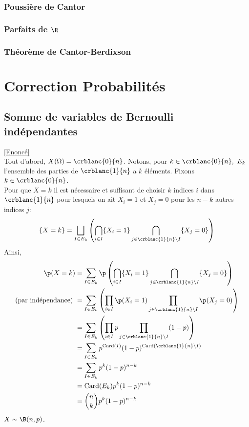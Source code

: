 \documentclass[8pt]{book}
\begin{document}
	\subsubsection{Poussière de Cantor}
	\subsubsection{Parfaits de $\R$}
	\subsubsection{Théorème de Cantor-Berdixson}
	
	\newpage
\section{Correction Probabilités}
	\subsection{Somme de variables de Bernoulli indépendantes }
	\label{Somme de variables de Bernoulli indépendantes corrigé}
		\textcolor{blue}{\hyperref[Somme de variables de Bernoulli indépedantes]{[Enoncé]}}\\
	Tout d'abord, $X(\Omega)=\crblanc{0}{n}$. Notons, pour $k\in \crblanc{0}{n},\ E_k$ l'ensemble des parties de $\crblanc{1}{n}$ a $k$ éléments. Fixons $k\in \crblanc{0}{n}$.\\
	Pour que $X=k$ il est nécessaire et suffisant de choisir $k$ indices $i$ dans $\crblanc{1}{n}$ pour lesquels on ait $X_i=1$ et $X_j=0$ pour les $n-k$ autres indices $j$:
	$$\{X=k\}=\displaystyle\bigsqcup\limits_{I\in E_k}\left(\bigcap\limits_{i\in I}\{X_i=1\}\bigcap\limits_{j\in \crblanc{1}{n}\backslash I}\{X_j=0\}\right)$$
	Ainsi,
	\begin{align*}
		\p(X=k)&=\displaystyle\sum\limits_{I\in E_k}\p\left(\bigcap\limits_{i\in I}\{X_i=1\}\bigcap\limits_{j\in \crblanc{1}{n}\backslash I}\{X_j=0\}\right)\\
		\text{(par indépendance) }&=\displaystyle\sum\limits_{I\in E_k}\left(\prod\limits_{i\in I}\p(X_i=1)\prod\limits_{j\in \crblanc{1}{n}\backslash I}\p(X_j=0)\right)\\
		&=\displaystyle\sum\limits_{I\in E_k}\left(\prod\limits_{i\in I}p\prod\limits_{j\in \crblanc{1}{n}\backslash I}(1-p)\right)\\
		&=\displaystyle\sum\limits_{I\in E_k}p^{\text{Card}(I)}(1-p)^{\text{Card}(\crblanc{1}{n}\backslash I)}\\
		&=\displaystyle\sum\limits_{I\in E_k}p^k(1-p)^{n-k}\\
		&=\text{Card}(E_k)p^k(1-p)^{n-k}\\
		&=\displaystyle\binom{n}{k}p^k(1-p)^{n-k}
	\end{align*}
	$X\sim\B(n,p)$.
	
\end{document}
